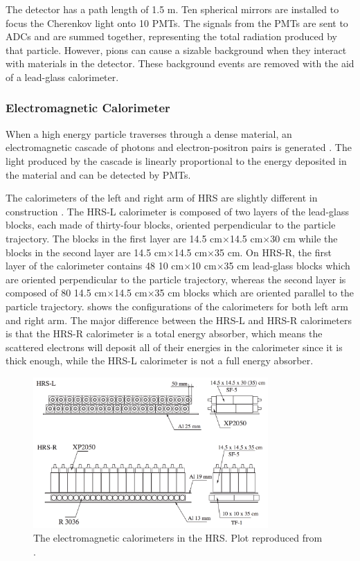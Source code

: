 The detector has a path length of 1.5 m. Ten spherical mirrors are installed to focus the Cherenkov light onto 10 PMTs. The signals from the PMTs are sent to ADCs and are summed together, representing the total radiation produced by that particle. However, pions can cause a sizable background when they interact with materials in the detector. These background events are removed with the aid of a lead-glass calorimeter.

\subsubsection{Electromagnetic Calorimeter}

When a high energy particle traverses through a dense material, an electromagnetic cascade of photons and electron-positron pairs is generated \cite{Leo1994}. The light produced by the cascade is linearly proportional to the energy deposited in the material and can be detected by PMTs.

The calorimeters of the left and right arm of HRS are slightly different in construction \cite{Alcorn2004}. The HRS-L calorimeter is composed of two layers of the lead-glass blocks, each made of thirty-four blocks, oriented perpendicular to the particle trajectory. The blocks in the first layer are 14.5 cm$\times$14.5 cm$\times$30 cm while the blocks in the second layer are 14.5 cm$\times$14.5 cm$\times$35 cm. On HRS-R, the first layer of the calorimeter contains 48 10 cm$\times$10 cm$\times$35 cm lead-glass blocks which are oriented perpendicular to the particle trajectory, whereas the second layer is composed of 80 14.5 cm$\times$14.5 cm$\times$35 cm blocks which are oriented parallel to the particle trajectory.  shows the configurations of the calorimeters for both left arm and right arm. The major difference between the HRS-L and HRS-R calorimeters is that the HRS-R calorimeter is a total energy absorber, which means the scattered electrons will deposit all of their energies in the calorimeter since it is thick enough, while the HRS-L calorimeter is not a full energy absorber.

\begin{figure}[tb!]
  \centering
  \includegraphics[width=0.8\textwidth]{figs/calorimeters.png}
  \caption[The electromagnetic calorimeters in the HRS.]{The electromagnetic calorimeters in the HRS. Plot reproduced from \cite{Alcorn2004}. \label{C5S4SS2F5}}
\end{figure}

